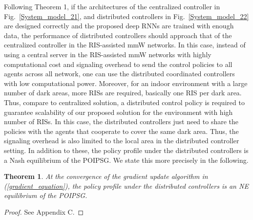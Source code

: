 \documentclass[conference]{IEEEtran}
\newtheorem{theorem}{\bf Theorem}
\begin{document}
Following Theorem 1, if the architectures of the centralized controller in Fig.~\ref{System_model_21}, and distributed controllers in Fig.~\ref{System_model_22} are designed correctly and the proposed deep RNNs are trained with enough data, the performance of distributed controllers should approach that of the centralized controller in the RIS-assisted mmW networks. In this case, instead of using a central server in the RIS-assisted mmW networks with highly computational cost and signaling overhead to send the control policies to all agents across all network, one can use the distributed coordinated controllers with low computational power. Moreover, for an indoor environment with a large number of dark areas, more RISs are required, basically one RIS per dark area. Thus, compare to centralized solution, a distributed control policy is required to guarantee scalability of our proposed solution for the environment with high number of RISs. In this case, the distributed controllers just need to share the policies with the agents that cooperate to cover the same dark area. Thus, the signaling overhead is also limited to the local area in the distributed controller setting. In addition to these, the policy profile under the distributed controllers is a Nash equilibrium of the POIPSG. We state this more precisely in the following.
\begin{theorem}
\textnormal{At the convergence of the gradient update algorithm in (\ref{gradient_equation}), the policy profile under the distributed controllers is an NE equilibrium of the POIPSG.}
\end{theorem}
\begin{proof}
See Appendix C.
\end{proof}
\end{document}
